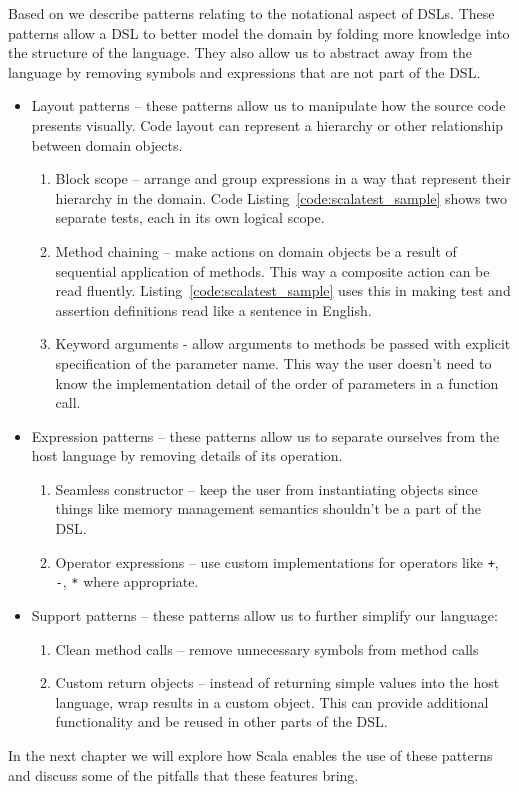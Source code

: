 Based on \autocite{Gunther:2011} we describe patterns relating to the notational aspect of DSLs.
These patterns allow a DSL to better model the domain by folding more knowledge into the structure of the language.
They also allow us to abstract away from the language by removing symbols and expressions that are not part of the DSL.

\begin{itemize}
	\item Layout patterns -- these patterns allow us to manipulate how the source code presents visually.
Code layout can represent a hierarchy or other relationship between domain objects.
	\begin{enumerate}
		\item Block scope -- arrange and group expressions in a way that represent their hierarchy in the domain.
Code Listing~\ref{code:scalatest_sample} shows two separate tests, each in its own logical scope.
		\item Method chaining -- make actions on domain objects be a result of sequential application of methods.
This way a composite action can be read fluently.
Listing~\ref{code:scalatest_sample} uses this in making test and assertion definitions read like a sentence in English.
		\item Keyword arguments - allow arguments to methods be passed with explicit specification of the parameter name.
This way the user doesn't need to know the implementation detail of the order of parameters in a function call.
	\end{enumerate}
	\item Expression patterns -- these patterns allow us to separate ourselves from the host language by removing details of its operation.
	\begin{enumerate}
		\item Seamless constructor -- keep the user from instantiating objects since things like memory management semantics shouldn't be a part of the DSL.
		\item Operator expressions -- use custom implementations for operators like \texttt{+}, \texttt{-}, \texttt{*} where appropriate.
	\end{enumerate}
	\item Support patterns -- these patterns allow us to further simplify our language:
	\begin{enumerate}
		\item Clean method calls -- remove unnecessary symbols from method calls
		\item Custom return objects -- instead of returning simple values into the host language, wrap results in a custom object.
This can provide additional functionality and be reused in other parts of the DSL.
	\end{enumerate}
\end{itemize}

In the next chapter we will explore how Scala enables the use of these patterns and discuss some of the pitfalls that these features bring.
